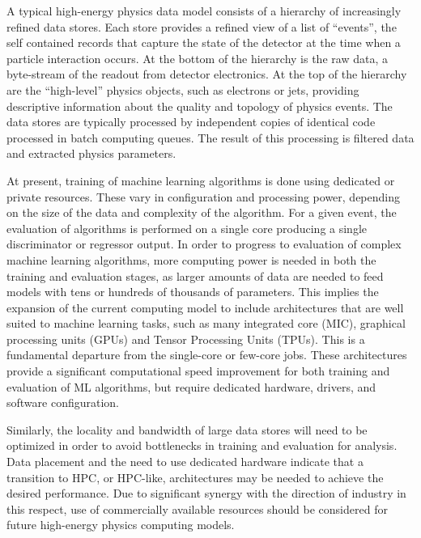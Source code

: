 \vspace{10pt} %
A typical high-energy physics data model consists of a hierarchy of increasingly refined data stores. Each store provides a refined view of a list of ``events'', the self contained records that capture the state of the detector at the time when a particle interaction occurs. At the bottom of the hierarchy is the raw data, a byte-stream of the readout from detector electronics. At the top of the hierarchy are the ``high-level'' physics objects, such as electrons or jets, providing descriptive information about the quality and topology of physics events. The data stores are typically processed by independent copies of identical code processed in batch computing queues. The result of this processing is filtered data and extracted physics parameters.%

At present, training of machine learning algorithms is done using dedicated or private resources. These vary in configuration and processing power, depending on the size of the data and complexity of the algorithm. For a given event, the evaluation of algorithms is performed on a single core producing a single discriminator or regressor output. In order to progress to evaluation of complex machine learning algorithms, more computing power is needed in both the training and evaluation stages, as larger amounts of data are needed to feed models with tens or hundreds of thousands of parameters. This implies the expansion of the current computing model to include architectures that are well suited to machine learning tasks, such as many integrated core (MIC), graphical processing units (GPUs) and Tensor Processing Units (TPUs). This is a fundamental departure from the single-core or few-core jobs. These architectures provide a significant computational speed improvement for both training and evaluation of ML algorithms, but require dedicated hardware, drivers, and software configuration.

Similarly, the locality and bandwidth of large data stores will need to be optimized in order to avoid bottlenecks in training and evaluation for analysis. Data placement and the need to use dedicated hardware indicate that a transition to HPC, or HPC-like, architectures may be needed to achieve the desired performance. Due to significant synergy with the direction of industry in this respect, use of commercially available resources should be considered for future high-energy physics computing models.


